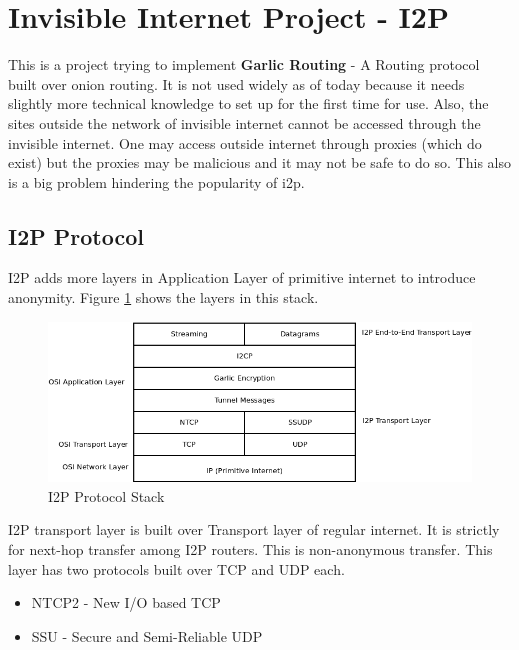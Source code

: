 \documentclass{main}
\begin{document}
\section{Invisible Internet Project - I2P}
This is a project trying to implement \textbf{Garlic Routing} - A Routing protocol built over onion routing.
It is not used widely as of today because it needs slightly more technical knowledge to set up for
the first time for use. Also, the sites outside the network of invisible internet cannot be accessed
through the invisible internet. One may access outside internet through proxies (which do exist) but 
the proxies may be malicious and it may not be safe to do so. This also is a big problem hindering the
popularity of i2p.

\subsection{I2P Protocol}
I2P adds more layers in Application Layer of primitive internet to introduce anonymity. Figure \ref{fig:i2p_protocol_stack}
shows the layers in this stack.

\begin{figure}[h]
	\centering
	\caption{I2P Protocol Stack}
	\label{fig:i2p_protocol_stack}
	\includegraphics[width=\textwidth]{Resources/images/i2p_protocol_stack.png}
\end{figure}

I2P transport layer is built over Transport layer of regular internet. It is strictly for next-hop transfer
among I2P routers. This is non-anonymous transfer. This layer has two protocols built over TCP and UDP each.
\begin{itemize}
	\item NTCP2 - New I/O based TCP
	\item SSU - Secure and Semi-Reliable UDP
\end{itemize}
\end{document}
